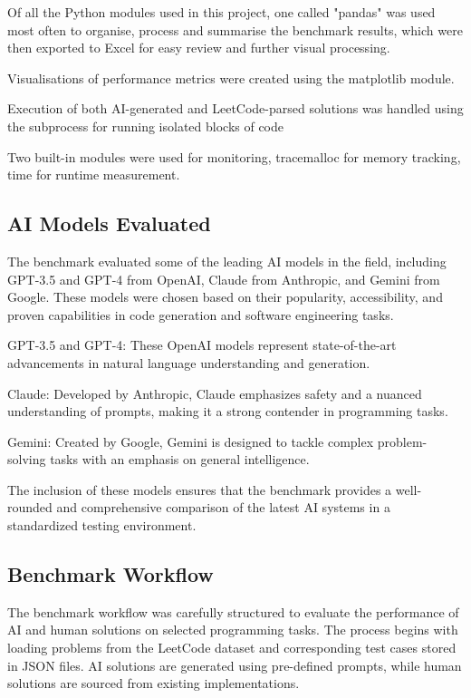 Of all the Python modules used in this project, one called "pandas" was used most often to organise, process and summarise the benchmark results, which were then exported to Excel for easy review and further visual processing. 

Visualisations of performance metrics were created using the matplotlib module. 

Execution of both AI-generated and LeetCode-parsed solutions was handled using the subprocess for running isolated blocks of code

Two built-in modules were used for monitoring, tracemalloc for memory tracking, time for runtime measurement.


\subsection{AI Models Evaluated}


The benchmark evaluated some of the leading AI models in the field, including GPT-3.5 and GPT-4 from OpenAI, Claude from Anthropic, and Gemini from Google. These models were chosen based on their popularity, accessibility, and proven capabilities in code generation and software engineering tasks.

GPT-3.5 and GPT-4: These OpenAI models represent state-of-the-art advancements in natural language understanding and generation.

Claude: Developed by Anthropic, Claude emphasizes safety and a nuanced understanding of prompts, making it a strong contender in programming tasks.

Gemini: Created by Google, Gemini is designed to tackle complex problem-solving tasks with an emphasis on general intelligence.

The inclusion of these models ensures that the benchmark provides a well-rounded and comprehensive comparison of the latest AI systems in a standardized testing environment.


\subsection{Benchmark Workflow}

The benchmark workflow was carefully structured to evaluate the performance of AI and human solutions on selected programming tasks. The process begins with loading problems from the LeetCode dataset and corresponding test cases stored in JSON files. AI solutions are generated using pre-defined prompts, while human solutions are sourced from existing implementations.

